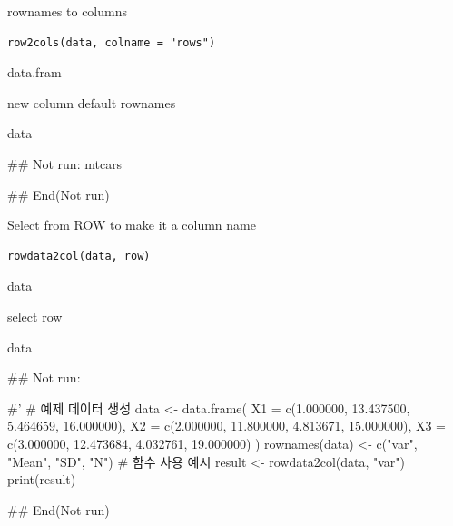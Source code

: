 \documentclass[a4paper]{book}
\begin{document}
%
\begin{Description}
rownames to columns
\end{Description}
%
\begin{Usage}
\begin{verbatim}
row2cols(data, colname = "rows")
\end{verbatim}
\end{Usage}
%
\begin{Arguments}
\begin{ldescription}
\item[\code{data}] data.fram

\item[\code{colname}] new column default rownames
\end{ldescription}
\end{Arguments}
%
\begin{Value}
data
\end{Value}
%
\begin{Examples}
\begin{ExampleCode}

\#\# Not run: 
mtcars %

## End(Not run)

\end{ExampleCode}
\end{Examples}

%
\begin{Description}
Select from ROW to make it a column name
\end{Description}
%
\begin{Usage}
\begin{verbatim}
rowdata2col(data, row)
\end{verbatim}
\end{Usage}
%
\begin{Arguments}
\begin{ldescription}
\item[\code{data}] data

\item[\code{row}] select row
\end{ldescription}
\end{Arguments}
%
\begin{Value}
data
\end{Value}
%
\begin{Examples}
\begin{ExampleCode}


\#\# Not run: 

#'
# 예제 데이터 생성
data <- data.frame(
  X1 = c(1.000000, 13.437500, 5.464659, 16.000000),
  X2 = c(2.000000, 11.800000, 4.813671, 15.000000),
  X3 = c(3.000000, 12.473684, 4.032761, 19.000000)
)
rownames(data) <- c("var", "Mean", "SD", "N")
# 함수 사용 예시
result <- rowdata2col(data, "var")
print(result)



## End(Not run)
\end{ExampleCode}
\end{Examples}
\end{document}
